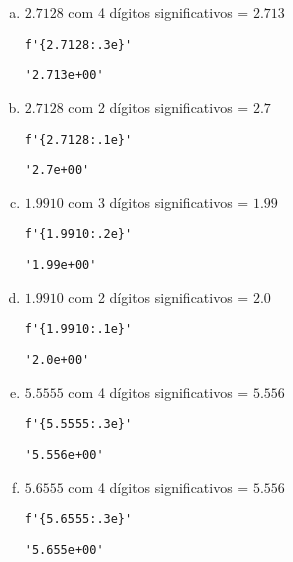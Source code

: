 \begin{resol}
  \begin{enumerate}[a)]
  \item $2.7128$ com 4 dígitos significativos = $2.713$

\begin{lstlisting}
f'{2.7128:.3e}'
\end{lstlisting}

\begin{verbatim}
'2.713e+00'
\end{verbatim}

    \item $2.7128$ com 2 dígitos significativos = $2.7$

\begin{lstlisting}
f'{2.7128:.1e}'
\end{lstlisting}

\begin{verbatim}
'2.7e+00'
\end{verbatim}

    \item $1.9910$ com 3 dígitos significativos = $1.99$

\begin{lstlisting}
f'{1.9910:.2e}'
\end{lstlisting}

\begin{verbatim}
'1.99e+00'
\end{verbatim}

\item $1.9910$ com 2 dígitos significativos = $2.0$
    
\begin{lstlisting}
f'{1.9910:.1e}'
\end{lstlisting}

\begin{verbatim}
'2.0e+00'
\end{verbatim}
        
  \item $5.5555$ com 4 dígitos significativos = $5.556$
    
\begin{lstlisting}
f'{5.5555:.3e}'
\end{lstlisting}

\begin{verbatim}
'5.556e+00'
\end{verbatim}
        
  \item $5.6555$ com 4 dígitos significativos = $5.556$
    
\begin{lstlisting}
f'{5.6555:.3e}'
\end{lstlisting}

\begin{verbatim}
'5.655e+00'
\end{verbatim}
        
  \end{enumerate}
\end{resol}

